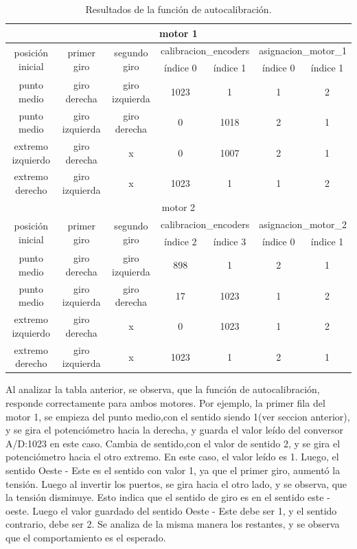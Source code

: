 \begin{table}[ht!]
	\begin{tabular}{|c|c|c|c|c|c|c|}
		\hline 
		\multicolumn{7}{|c|}{motor 1} \\
		\hline 
		\multirow{2}{*}{posición inicial} & 
		\multirow{2}{*}{primer giro} &\multirow{2}{*}{segundo giro} & \multicolumn{2}{l|}{calibracion\_encoders}& \multicolumn{2}{l|}{asignacion\_motor\_1} \\ \cline{4-7} 
		   & & & índice 0 &índice 1 &índice 0 &  índice 1 \\
		 \hline 
	      punto medio & giro derecha & giro izquierda & 1023 & 1 & 1 & 2 \\
	     \hline 
		 punto medio & giro izquierda & giro derecha & 0 & 1018 & 2 & 1 \\
		 \hline 	
		extremo izquierdo & giro derecha & x & 0 & 1007 & 2 & 1 \\
		\hline 
	    extremo derecho & giro izquierda & x & 1023 & 1 & 1 & 2 \\
		\hline 	
		\hline
		
		\multicolumn{7}{|c|}{motor 2} \\
		\hline 
		
		\multirow{2}{*}{posición inicial} & 
		\multirow{2}{*}{primer giro} &\multirow{2}{*}{segundo giro} & \multicolumn{2}{l|}{calibracion\_encoders}& \multicolumn{2}{l|}{asignacion\_motor\_2} \\ \cline{4-7} 
		   & & & índice 2 &índice 3 &índice 0 &  índice 1 \\ 
		\hline 
		 punto medio & giro derecha & giro izquierda & 898 & 1 & 2 & 1  \\
		\hline 
		 punto medio & giro izquierda & giro derecha & 17 & 1023 & 1 &2  \\
		\hline 	
		 extremo izquierdo & giro derecha & x & 0 & 1023 & 1 &2  \\
		\hline 
		 extremo derecho & giro izquierda & x & 1023 & 1 & 2 & 1 \\
		\hline
		\end{tabular}
	\caption{Resultados de la función de autocalibración.}
	\label{tab:resultados_autocalibracion}
\end{table}

Al analizar la tabla anterior, se observa, que la función de autocalibración, responde correctamente para ambos motores. Por ejemplo, la primer fila del motor 1, se empieza del punto medio,con el sentido siendo 1(ver seccion anterior), y se gira el potenciómetro hacia la derecha, y guarda el valor leído del conversor A/D:1023 en este caso. Cambia de sentido,con el valor de sentido 2, y se gira el potenciómetro hacia el otro extremo. En este caso, el valor leído es 1. Luego, el sentido Oeste - Este es el sentido con valor 1, ya que el primer giro, aumentó la tensión. Luego al invertir los puertos, se gira hacia el otro lado, y se observa, que la tensión disminuye. Esto indica que el sentido de giro es en el sentido este - oeste. Luego el valor guardado del sentido Oeste - Este debe ser 1, y el sentido contrario, debe ser 2. Se analiza de la misma manera los restantes, y se observa que el comportamiento es el esperado. 

